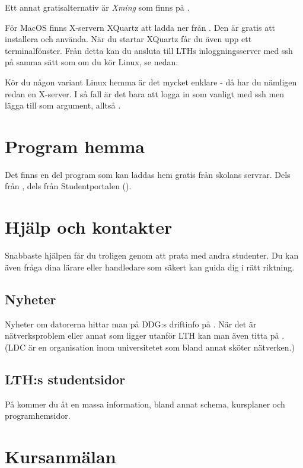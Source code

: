 \documentclass[a4paper,twocolumn]{book}
\begin{document}
Ett annat gratisalternativ är \emph{Xming} som finns på
.

För MacOS finns X-servern XQuartz att ladda ner från . Den är gratis att installera och använda. När du startar XQuartz får du även upp ett terminalfönster. Från detta kan du ansluta till LTHs inloggningsserver med ssh på samma sätt som om du kör Linux, se nedan.

Kör du någon variant Linux hemma är det mycket enklare - då har du nämligen redan
en X-server. I så fall är det bara att logga in som vanligt med ssh men lägga
till  som argument, alltså .

\section{Program hemma}

Det finns en del program som kan laddas hem gratis från skolans servrar. Dels
från , dels från Studentportalen 
(). 

\section{Hjälp och kontakter}

Snabbaste hjälpen får du troligen genom att prata med andra studenter. Du kan även fråga dina lärare eller handledare som säkert kan guida dig i rätt riktning.

\subsection{Nyheter}
Nyheter om datorerna hittar man på DDG:s driftinfo på
. När det är nätverksproblem eller annat som ligger
utanför LTH kan man även titta på . (LDC är en
organisation inom universitetet som bland annat sköter nätverken.)

\subsection{LTH:s studentsidor}

På  kommer du åt en massa information, bland
annat schema, kursplaner och programhemsidor.

\section{Kursanmälan}
\end{document}
